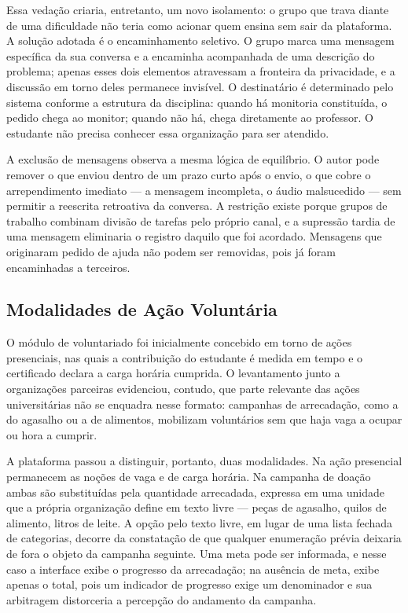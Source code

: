 Essa vedação criaria, entretanto, um novo isolamento: o grupo que trava diante
de uma dificuldade não teria como acionar quem ensina sem sair da plataforma.
A solução adotada é o encaminhamento seletivo. O grupo marca uma mensagem
específica da sua conversa e a encaminha acompanhada de uma descrição do
problema; apenas esses dois elementos atravessam a fronteira da privacidade, e
a discussão em torno deles permanece invisível. O destinatário é determinado
pelo sistema conforme a estrutura da disciplina: quando há monitoria
constituída, o pedido chega ao monitor; quando não há, chega diretamente ao
professor. O estudante não precisa conhecer essa organização para ser
atendido.

A exclusão de mensagens observa a mesma lógica de equilíbrio. O autor pode
remover o que enviou dentro de um prazo curto após o envio, o que cobre o
arrependimento imediato --- a mensagem incompleta, o áudio malsucedido ---
sem permitir a reescrita retroativa da conversa. A restrição existe porque
grupos de trabalho combinam divisão de tarefas pelo próprio canal, e a
supressão tardia de uma mensagem eliminaria o registro daquilo que foi
acordado. Mensagens que originaram pedido de ajuda não podem ser removidas,
pois já foram encaminhadas a terceiros.

\subsection{Modalidades de Ação Voluntária}
\label{modalidades-voluntariado}

O módulo de voluntariado foi inicialmente concebido em torno de ações
presenciais, nas quais a contribuição do estudante é medida em tempo e o
certificado declara a carga horária cumprida. O levantamento junto a
organizações parceiras evidenciou, contudo, que parte relevante das ações
universitárias não se enquadra nesse formato: campanhas de arrecadação, como a
do agasalho ou a de alimentos, mobilizam voluntários sem que haja vaga a
ocupar ou hora a cumprir.

A plataforma passou a distinguir, portanto, duas modalidades. Na ação
presencial permanecem as noções de vaga e de carga horária. Na campanha de
doação ambas são substituídas pela quantidade arrecadada, expressa em uma
unidade que a própria organização define em texto livre --- peças de
agasalho, quilos de alimento, litros de leite. A opção pelo texto livre, em
lugar de uma lista fechada de categorias, decorre da constatação de que
qualquer enumeração prévia deixaria de fora o objeto da campanha seguinte.
Uma meta pode ser informada, e nesse caso a interface exibe o progresso da
arrecadação; na ausência de meta, exibe apenas o total, pois um indicador de
progresso exige um denominador e sua arbitragem distorceria a percepção do
andamento da campanha.

